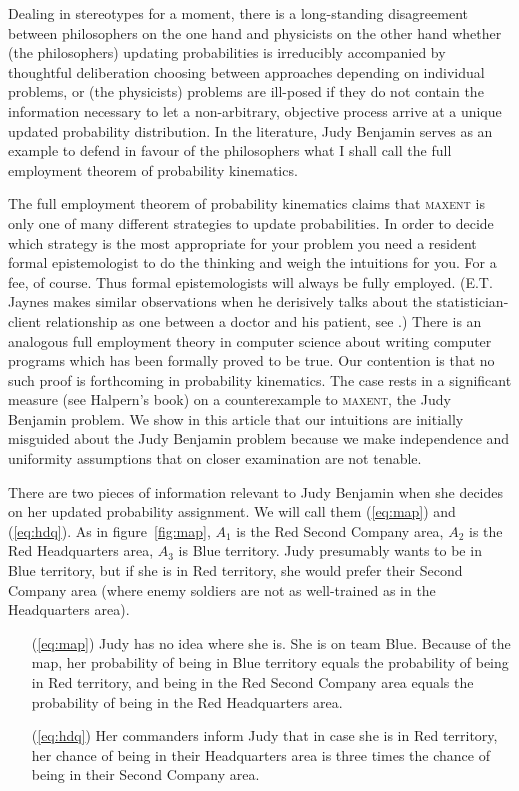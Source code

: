 \documentclass[12pt]{article}
\begin{document}
Dealing in stereotypes for a moment, there is a long-standing
disagreement between philosophers on the one hand and physicists on
the other hand whether (the philosophers) updating probabilities is
irreducibly accompanied by thoughtful deliberation choosing between
approaches depending on individual problems, or (the physicists)
problems are ill-posed if they do not contain the information
necessary to let a non-arbitrary, objective process arrive at a
unique updated probability distribution. In the literature, Judy
Benjamin serves as an example to defend in favour of the philosophers
what I shall call the full employment theorem of probability
kinematics.

The full employment theorem of probability kinematics claims that
\textsc{maxent} is only one of many different strategies to update
probabilities. In order to decide which strategy is the most
appropriate for your problem you need a resident formal epistemologist
to do the thinking and weigh the intuitions for you. For a fee, of
course. Thus formal epistemologists will always be fully employed.
(E.T. Jaynes makes similar observations when he derisively talks about
the statistician-client relationship as one between a doctor and his
patient, see .) There is an analogous
full employment theory in computer science about writing computer
programs which has been formally proved to be true. Our contention is
that no such proof is forthcoming in probability kinematics. The case
rests in a significant measure (see Halpern's book) on a
counterexample to \textsc{maxent}, the Judy Benjamin problem. We show
in this article that our intuitions are initially misguided about the
Judy Benjamin problem because we make independence and uniformity
assumptions that on closer examination are not tenable.

\medskip


\smallskip

\nias There are two pieces of information relevant to Judy Benjamin
when she decides on her updated probability assignment. We will call
them ({\ref{eq:map}}) and ({\ref{eq:hdq}}). As in
figure~\ref{fig:map}, $A_{1}$ is the Red Second Company area, $A_{2}$ is
the Red Headquarters area, $A_{3}$ is Blue territory. Judy presumably
wants to be in Blue territory, but if she is in Red territory, she
would prefer their Second Company area (where enemy soldiers are not
as well-trained as in the Headquarters area).

\begin{enumerate}
\item[({\ref{eq:map}})] Judy has no idea where she is. She is on team Blue.
  Because of the map, her probability of being in Blue territory
  equals the probability of being in Red territory, and being in the Red
  Second Company area equals the probability of being in the Red
  Headquarters area.
\item[({\ref{eq:hdq}})] Her commanders inform Judy that in case she is in Red
  territory, her chance of being in their Headquarters area is three
  times the chance of being in their Second Company area.
\end{enumerate}
\end{document}
